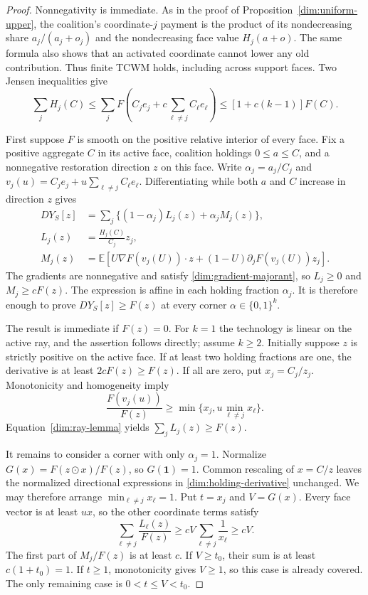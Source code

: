 \documentclass[11pt]{article}
\newcommand{\E}{\mathbb E}
\theoremstyle{definition}\newtheorem{definition}[theorem]{Definition}
\theoremstyle{remark}\newtheorem{remark}[theorem]{Remark}
\begin{document}
\begin{proof}
Nonnegativity is immediate. As in the proof of
Proposition~\ref{dim:uniform-upper}, the coalition's coordinate-$j$
payment is the product of its nondecreasing share $a_j/(a_j+o_j)$ and
the nondecreasing face value $H_j(a+o)$. The same formula also shows that
an activated coordinate cannot lower any old contribution. Thus finite
TCWM holds, including across support faces. Two Jensen inequalities give
\[
 \sum_jH_j(C)
 \le\sum_jF\left(C_je_j+c\sum_{\ell\ne j}C_\ell e_\ell\right)
 \le[1+c(k-1)]F(C).
\]

First suppose $F$ is smooth on the positive relative interior of every
face. Fix a positive aggregate $C$ in its active face, coalition holdings
$0\le a\le C$, and a nonnegative restoration direction $z$ on this face.
Write $\alpha_j=a_j/C_j$ and
$v_j(u)=C_je_j+u\sum_{\ell\ne j}C_\ell e_\ell$.
Differentiating while both $a$ and $C$ increase in direction $z$ gives
\begin{align}
 D Y_S[z]&=\sum_j\{(1-\alpha_j)L_j(z)+\alpha_j M_j(z)\},
 \label{dim:holding-derivative}\\
 L_j(z)&=\frac{H_j(C)}{C_j}z_j,\nonumber\\
 M_j(z)&=\E\left[U\nabla F(v_j(U))\cdot z
 +(1-U)\partial_jF(v_j(U))z_j\right].\nonumber
\end{align}
The gradients are nonnegative and satisfy
\eqref{dim:gradient-majorant}, so $L_j\ge0$ and $M_j\ge cF(z)$.
The expression is affine in each holding fraction $\alpha_j$.
It is therefore enough to prove $DY_S[z]\ge F(z)$ at every corner
$\alpha\in\{0,1\}^k$.

The result is immediate if $F(z)=0$. For $k=1$ the technology is linear
on the active ray, and the assertion follows directly; assume $k\ge2$.
Initially suppose $z$ is strictly
positive on the active face. If at least two holding fractions are one,
the derivative is at least $2cF(z)\ge F(z)$.
If all are zero, put $x_j=C_j/z_j$. Monotonicity and homogeneity imply
\[
 \frac{F(v_j(u))}{F(z)}
 \ge\min\{x_j,u\min_{\ell\ne j}x_\ell\}.
\]
Equation~\eqref{dim:ray-lemma} yields $\sum_jL_j(z)\ge F(z)$.

It remains to consider a corner with only $\alpha_j=1$.
Normalize $G(x)=F(z\mathbin{\odot}x)/F(z)$, so $G(\mathbf1)=1$.
Common rescaling of $x=C/z$ leaves the normalized directional expressions
in \eqref{dim:holding-derivative} unchanged. We may therefore arrange
$\min_{\ell\ne j}x_\ell=1$. Put $t=x_j$ and $V=G(x)$.
Every face vector is at least $u x$, so the other coordinate terms satisfy
\[
 \sum_{\ell\ne j}\frac{L_\ell(z)}{F(z)}
 \ge cV\sum_{\ell\ne j}\frac1{x_\ell}\ge cV.
\]
The first part of $M_j/F(z)$ is at least $c$.
If $V\ge t_0$, their sum is at least $c(1+t_0)=1$.
If $t\ge1$, monotonicity gives $V\ge1$, so this case is already covered.
The only remaining case is $0<t\le V<t_0$.


\end{proof}
\end{document}
